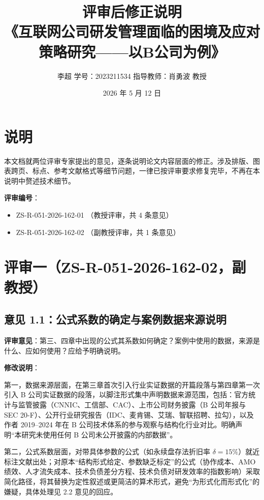 \documentclass[11pt,a4paper]{ctexart}
\title{\textbf{评审后修正说明}\\
\large《互联网公司研发管理面临的困境及应对策略研究——以B公司为例》}
\author{李超 \quad 学号：2023211534 \quad 指导教师：肖勇波 教授}
\date{2026 年 5 月 12 日}
\begin{document}
\maketitle
\thispagestyle{fancy}

\section*{说明}

本文档就两位评审专家提出的意见，逐条说明论文内容层面的修正。涉及排版、图表跨页、标点、参考文献格式等细节问题，一律已按评审要求修复完毕，不再在本说明中赘述技术细节。

\vspace{0.5em}
\noindent\textbf{评审编号}：
\begin{itemize}[leftmargin=2em,itemsep=0.2em]
  \item ZS-R-051-2026-162-01 \quad （教授评审，共 4 条意见）
  \item ZS-R-051-2026-162-02 \quad （副教授评审，共 1 条意见）
\end{itemize}

\section{评审一（ZS-R-051-2026-162-02，副教授）}

\subsection{意见 1.1：公式系数的确定与案例数据来源说明}

\noindent\textbf{评审意见}：第三、四章中出现的公式其系数如何确定？案例中使用的数据，来源是什么、应如何使用？应给予明确说明。

\vspace{0.3em}
\noindent\textbf{修改说明}：

第一，数据来源层面，在第三章首次引入行业实证数据的开篇段落与第四章第一次引入 B 公司实证数据的段落，以脚注形式集中声明数据来源范围，包括：官方统计与监管披露（CNNIC、工信部、CAC）、上市公司财务披露（B 公司年报与 SEC 20-F）、公开行业研究报告（IDC、麦肯锡、艾瑞、智联招聘、拉勾），以及作者 2019--2024 年在 B 公司技术体系的参与观察与结构化行业对比。明确声明“本研究未使用任何 B 公司未公开披露的内部数据”。

第二，公式系数层面，对带具体参数的公式（如永续盘存法折旧率 $\delta=15\%$）就近标注文献出处；对原本“结构形式给定、参数缺乏标定”的公式（协作成本、AMO 绩效、人才流失成本、技术负债差分方程、技术负债对研发效率的指数影响）采取简化路径，将其替换为定性叙述或更简洁的算术形式，避免“为形式化而形式化”的嫌疑，具体处理见 2.2 意见的回应。
\end{document}
